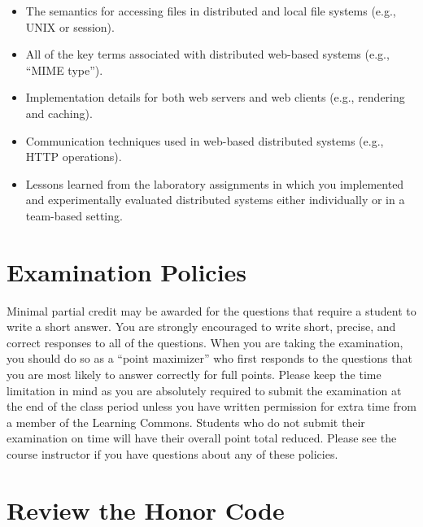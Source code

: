 \begin{itemize}[leftmargin=0.25in]
  \item The semantics for accessing files in distributed and local file systems (e.g., UNIX or session).

  \item All of the key terms associated with distributed web-based systems (e.g., ``MIME type'').

  \item Implementation details for both web servers and web clients (e.g., rendering and caching).

  \item Communication techniques used in web-based distributed systems (e.g., HTTP operations).

  \item Lessons learned from the laboratory assignments in which you implemented and experimentally evaluated
    distributed systems either individually or in a team-based setting.


\end{itemize}

\vspace*{-.05in}
\section*{Examination Policies}

\vspace*{-.05in}
\noindent Minimal partial credit may be awarded for the questions that require a student to write a short answer. You
are strongly encouraged to write short, precise, and correct responses to all of the questions. When you are taking the
examination, you should do so as a ``point maximizer'' who first responds to the questions that you are most likely to
answer correctly for full points. Please keep the time limitation in mind as you are absolutely required to submit the
examination at the end of the class period unless you have written permission for extra time from a member of the
Learning Commons. Students who do not submit their examination on time will have their overall point total reduced.
Please see the course instructor if you have questions about any of these policies.

\vspace*{-.2in}
\section*{Review the Honor Code}
\vspace*{-.1in}

